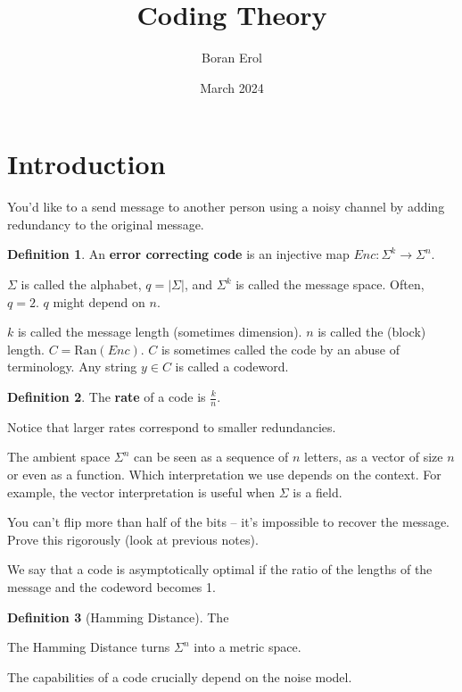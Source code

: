 \documentclass{article}
\title{Coding Theory}
\date{March 2024}
\author{Boran Erol}
\theoremstyle{definition}
\newtheorem{definition}{Definition}
\newcommand{\ran}{\text{Ran}}
\begin{document}
\maketitle

\section{Introduction}

You'd like to a send message to another person using a noisy channel by adding
redundancy to the original message. 

\begin{definition}
    An \textbf{error correcting code} is an injective map $Enc: \Sigma^{k} \xrightarrow{} \Sigma^{n}$.
\end{definition}

$\Sigma$ is called the alphabet, $q = \lvert \Sigma \rvert$, and $\Sigma^{k}$ is called the message space.
Often, $q = 2$. $q$ might depend on $n$.

$k$ is called the message length (sometimes dimension). $n$ is called the (block) length.
$C = \ran(Enc)$. $C$ is sometimes called the code by an abuse of terminology. Any string $y \in C$ is called
a codeword.

\begin{definition}
    The \textbf{rate} of a code is $\frac{k}{n}$.
\end{definition}

Notice that larger rates correspond to smaller redundancies.

The ambient space $\Sigma^{n}$ can be seen as a sequence of $n$ letters, as a vector of size $n$ or even as 
a function. Which interpretation we use depends on the context. For example, the vector interpretation is
useful when $\Sigma$ is a field.

You can't flip more than half of the bits -- it's impossible to recover the message.
Prove this rigorously (look at previous notes).

We say that a code is asymptotically optimal if the ratio of the lengths of the message
and the codeword becomes 1.

\begin{definition}[Hamming Distance]
    The 
\end{definition}

The Hamming Distance turns $\Sigma^{n}$ into a metric space.

The capabilities of a code crucially depend on the noise model.
\end{document}
